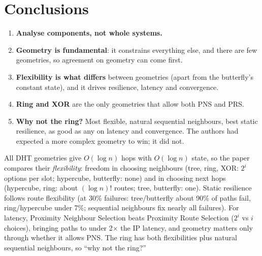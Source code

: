 \section{Conclusions}
\begin{enumerate}
  \item \textbf{Analyse components, not whole systems.}
  \item \textbf{Geometry is fundamental}: it constrains everything else, and there are few geometries, so agreement on geometry can come first.
  \item \textbf{Flexibility is what differs} between geometries (apart from the butterfly's constant state), and it drives resilience, latency and convergence.
  \item \textbf{Ring and XOR} are the only geometries that allow both PNS and PRS.
  \item \textbf{Why not the ring?} Most flexible, natural sequential neighbours, best static resilience, as good as any on latency and convergence. The authors had
        expected a more complex geometry to win; it did not.
\end{enumerate}

\begin{keybox}
All DHT geometries give $O(\log n)$ hops with $O(\log n)$ state, so the paper compares their \emph{flexibility}: freedom in choosing neighbours (tree, ring, XOR: $2^{i}$
options per slot; hypercube, butterfly: none) and in choosing next hops (hypercube, ring: about $(\log n)!$ routes; tree, butterfly: one). Static resilience follows route
flexibility (at 30\% failures: tree/butterfly about 90\% of paths fail, ring/hypercube under 7\%; sequential neighbours fix nearly all failures). For latency, Proximity
Neighbour Selection beats Proximity Route Selection ($2^i$ vs $i$ choices), bringing paths to under 2$\times$ the IP latency, and geometry matters only through whether it
allows PNS. The ring has both flexibilities plus natural sequential neighbours, so ``why not the ring?''
\end{keybox}

